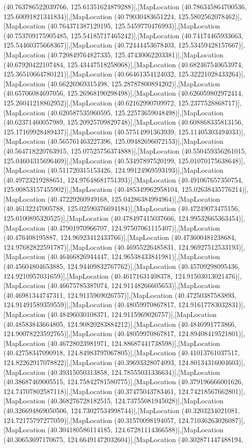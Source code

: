 (40.763786522039766, 125.61351624879288)],[MapLocation (40.786345864700536, 125.60091821341834)],[MapLocation (40.79030483651224, 125.5802562078462)],[MapLocation (40.764371387129195, 125.5459770476993)],[MapLocation (40.753709175905485, 125.54185717465242)],[MapLocation (40.74174465933663, 125.54460375668367)],[MapLocation (40.72444453678403, 125.53459428157667)],[MapLocation (40.720849764827335, 125.47430062203381)],[MapLocation (40.67920422107484, 125.43447518258068)],[MapLocation (40.682467540653974, 125.36510664780121)],[MapLocation (40.66461354124032, 125.32221028433264)],[MapLocation (40.66226969315498, 125.28787800894202)],[MapLocation (40.65706084697056, 125.26968190298498)],[MapLocation (40.626059802972414, 125.26041218862952)],[MapLocation (40.62162990709972, 125.2377528868717)],[MapLocation (40.620587535960595, 125.22573659048498)],[MapLocation (40.62371460057989, 125.20925709829748)],[MapLocation (40.608868335813156, 125.17169928489437)],[MapLocation (40.57514991363939, 125.11405303494033)],[MapLocation (40.565761463227396, 125.09482696072153)],[MapLocation (40.564718220763915, 125.07525756374888)],[MapLocation (40.550459356261015, 125.04604315696469)],[MapLocation (40.53497897520199, 125.01070175638648)],[MapLocation (40.511720315153426, 124.99124969593193)],[MapLocation (40.49723219288651, 124.97648681751393)],[MapLocation (40.491067657350754, 125.00853157455902)],[MapLocation (40.485349962958104, 125.02638435776214)],[MapLocation (40.47229260949168, 125.04286384994964)],[MapLocation (40.46132247005788, 125.02590376694184)],[MapLocation (40.47249073475156, 125.0100895320525)],[MapLocation (40.478497415037666, 124.99532665363454)],[MapLocation (40.47901970966707, 124.97507061115407)],[MapLocation (40.476408195887, 124.96923412433766)],[MapLocation (40.473600481238684, 124.97682822591787)],[MapLocation (40.46955226485831, 124.96927512533193)],[MapLocation (40.46466826944447, 124.96538433841981)],[MapLocation (40.45604804653885, 124.94409832767762)],[MapLocation (40.45709298095436, 124.9210957031659)],[MapLocation (40.46171631408378, 124.91503013021476)],[MapLocation (40.46675785387074, 124.91148266605653)],[MapLocation (40.46981344747311, 124.9115969026757)],[MapLocation (40.47250387583893, 124.91491589359559)],[MapLocation (40.48059970867817, 124.91617783032831)],[MapLocation (40.48496030108371, 124.9115969026757)],[MapLocation (40.48583843664805, 124.90820283884212)],[MapLocation (40.4846991773866, 124.90078223592765)],[MapLocation (40.48059970867817, 124.89408419521801)],[MapLocation (40.46728023981971, 124.88687441738598)],[MapLocation (40.42758347090918, 124.84983797067805)],[MapLocation (40.41013761037517, 124.82262917078822)],[MapLocation (40.39693328074093, 124.80134316004603)],[MapLocation (40.39315050313858, 124.78555031336634)],[MapLocation (40.38687469005515, 124.75842781580775)],[MapLocation (40.379196666001626, 124.74707802587118)],[MapLocation (40.37475043783461, 124.74218567662801)],[MapLocation (40.368276728182515, 124.73755081945028)],[MapLocation (40.326694869050506, 124.73027534998744)],[MapLocation (40.3203234021081, 124.72175797277059)],[MapLocation (40.31570098194057, 124.71036263026087)],[MapLocation (40.304180586114185, 124.67281114366588)],[MapLocation (40.30653697170675, 124.66491472032604)],[MapLocation (40.302871447488194, 